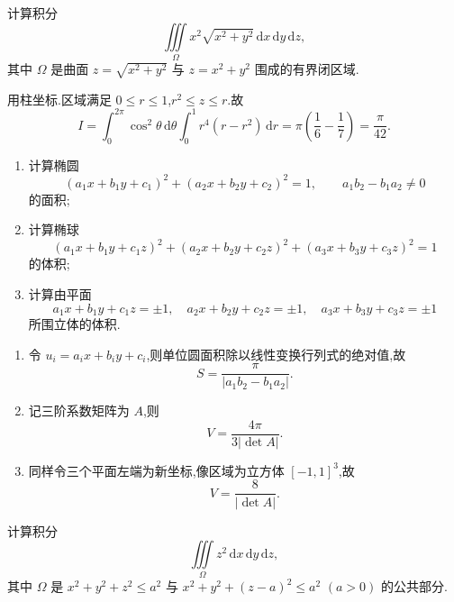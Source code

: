 \begin{example}
    计算积分
    \[
        \displaystyle\iiint\limits_\Omega x^2\sqrt{x^2+y^2}\,\mathrm{d}x\,\mathrm{d}y\,\mathrm{d}z,
    \]
    其中 $\Omega$ 是曲面 $z=\sqrt{x^2+y^2}$ 与 $z=x^2+y^2$ 围成的有界闭区域.
\end{example}
\exampleblank

\begin{solution}
    用柱坐标.区域满足 $0\leq r\leq1$,$r^2\leq z\leq r$.故
    \[
        I=\int_0^{2\pi}\cos^2\theta\,\mathrm{d}\theta
        \int_0^1r^4(r-r^2)\,\mathrm{d}r
        =\pi\left(\dfrac{1}{6}-\dfrac{1}{7}\right)=\dfrac{\pi}{42}.
    \]
\end{solution}

\begin{example}
    \begin{enumerate}
        \item 计算椭圆
              \[
                  (a_1x+b_1y+c_1)^2+(a_2x+b_2y+c_2)^2=1,
                  \qquad a_1b_2-b_1a_2\ne0
              \]
              的面积;
        \item 计算椭球
              \[
                  (a_1x+b_1y+c_1z)^2+(a_2x+b_2y+c_2z)^2+(a_3x+b_3y+c_3z)^2=1
              \]
              的体积;
        \item 计算由平面
              \[
                  a_1x+b_1y+c_1z=\pm1,\quad
                  a_2x+b_2y+c_2z=\pm1,\quad
                  a_3x+b_3y+c_3z=\pm1
              \]
              所围立体的体积.
    \end{enumerate}
\end{example}
\exampleblank

\begin{solution}
    \leavevmode
    \begin{enumerate}
        \item 令 $u_i=a_ix+b_iy+c_i$,则单位圆面积除以线性变换行列式的绝对值,故
              \[
                  S=\dfrac{\pi}{|a_1b_2-b_1a_2|}.
              \]
        \item 记三阶系数矩阵为 $A$,则
              \[
                  V=\dfrac{4\pi}{3|\det A|}.
              \]
        \item 同样令三个平面左端为新坐标,像区域为立方体 $[-1,1]^3$,故
              \[
                  V=\dfrac{8}{|\det A|}.
              \]
    \end{enumerate}
\end{solution}

\begin{example}
    计算积分
    \[
        \displaystyle\iiint\limits_\Omega z^2\,\mathrm{d}x\,\mathrm{d}y\,\mathrm{d}z,
    \]
    其中 $\Omega$ 是 $x^2+y^2+z^2\leq a^2$ 与 $x^2+y^2+(z-a)^2\leq a^2$ $(a>0)$ 的公共部分.
\end{example}
\exampleblank

